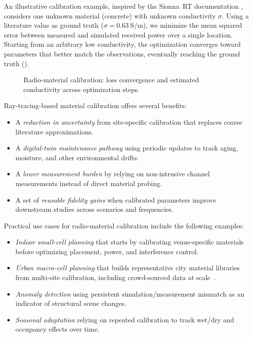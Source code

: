 An illustrative calibration example, inspired by the Sionna~RT documentation , considers one unknown material (concrete) with unknown conductivity $\sigma$. Using a literature value as ground truth ($\sigma = \qty{0.63}{\siemens\per\meter}$), we minimize the mean squared error between measured and simulated received power over a single location. Starting from an arbitrary low conductivity, the optimization converges toward parameters that better match the observations, eventually reaching the ground truth ().

\begin{figure}
  \centering
  \caption{Radio-material calibration: loss convergence and estimated conductivity across optimization steps.}
\end{figure}

Ray-tracing-based material calibration offers several benefits:
\begin{itemize}
  \item A \emph{reduction in uncertainty} from site-specific calibration that replaces coarse literature approximations.
  \item A \emph{digital-twin maintenance pathway} using periodic updates to track aging, moisture, and other environmental drifts.
  \item A \emph{lower measurement burden} by relying on non-intrusive channel measurements instead of direct material probing.
  \item A set of \emph{reusable fidelity gains} when calibrated parameters improve downstream studies across scenarios and frequencies.
\end{itemize}

Practical use cases for radio-material calibration include the following examples:
\begin{itemize}
  \item \emph{Indoor small-cell planning} that starts by calibrating venue-specific materials before optimizing placement, power, and interference control.
  \item \emph{Urban macro-cell planning} that builds representative city material libraries from multi-site calibration, including crowd-sourced data at scale~.
  \item \emph{Anomaly detection} using persistent simulation/measurement mismatch as an indicator of structural scene changes.
  \item \emph{Seasonal adaptation} relying on repeated calibration to track wet/dry and occupancy effects over time.
\end{itemize}

